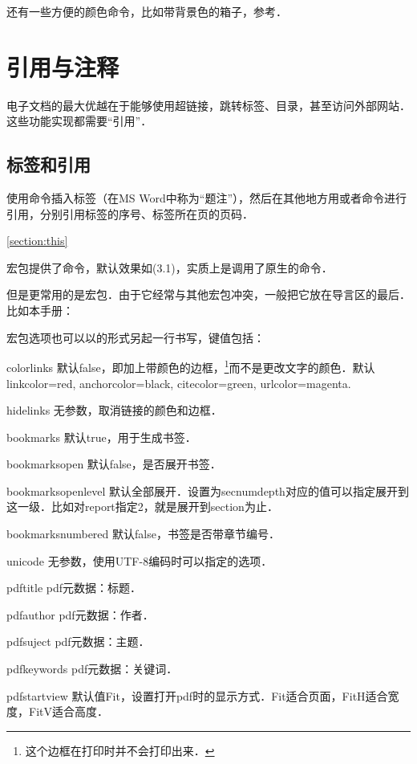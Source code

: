 还有一些方便的颜色命令，比如带背景色的箱子，参考．

\section{引用与注释}
电子文档的最大优越在于能够使用超链接，跳转标签、目录，甚至访问外部网站．这些功能实现都需要“引用”．
\subsection{标签和引用}
使用命令插入标签（在MS Word中称为“题注”），然后在其他地方用或者命令进行引用，分别引用标签的序号、标签所在页的页码．
\begin{latex}
\label{section:this}
\ref{section:this}
\pageref{section:this}
\end{latex}

宏包提供了命令，默认效果如(3.1)，实质上是调用了原生的命令．

但是更常用的是宏包．由于它经常与其他宏包冲突，一般把它放在导言区的最后．比如本手册：
\begin{latex}
\usepackage[colorlinks,bookmarksopen=true,
    bookmarksnumbered=true]{hyperref}
\end{latex}

宏包选项也可以以的形式另起一行书写，键值包括：
\begin{para}
\item[colorlinks] 默认false，即加上带颜色的边框，\footnote{这个边框在打印时并不会打印出来．}而不是更改文字的颜色．默认linkcolor=red, anchorcolor=black, citecolor=green, urlcolor=magenta. 
\item[hidelinks] 无参数，取消链接的颜色和边框．
\item[bookmarks] 默认true，用于生成书签．
\item[bookmarksopen] 默认false，是否展开书签．
\item[bookmarksopenlevel] 默认全部展开．设置为secnumdepth对应的值可以指定展开到这一级．比如对report指定2，就是展开到section为止．
\item[bookmarksnumbered] 默认false，书签是否带章节编号．
\item[unicode] 无参数，使用UTF-8编码时可以指定的选项．
\item[pdftitle] pdf元数据：标题．
\item[pdfauthor] pdf元数据：作者．
\item[pdfsuject] pdf元数据：主题．
\item[pdfkeywords] pdf元数据：关键词．
\item[pdfstartview] 默认值Fit，设置打开pdf时的显示方式．Fit适合页面，FitH适合宽度，FitV适合高度．
\end{para}

